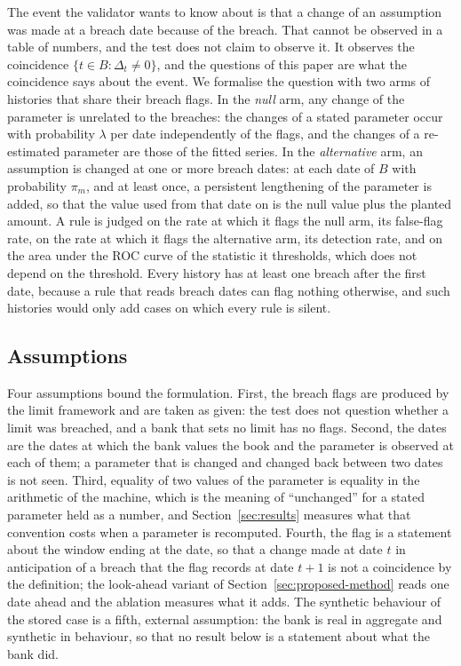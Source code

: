 The event the validator wants to know about is that a change of an assumption was made at a breach date because of the breach. That cannot be observed in a table of numbers, and the test does not claim to observe it. It observes the coincidence $\{t\in B:\Delta_t\ne 0\}$, and the questions of this paper are what the coincidence says about the event. We formalise the question with two arms of histories that share their breach flags. In the \emph{null} arm, any change of the parameter is unrelated to the breaches: the changes of a stated parameter occur with probability $\lambda$ per date independently of the flags, and the changes of a re-estimated parameter are those of the fitted series. In the \emph{alternative} arm, an assumption is changed at one or more breach dates: at each date of $B$ with probability $\pi_m$, and at least once, a persistent lengthening of the parameter is added, so that the value used from that date on is the null value plus the planted amount. A rule is judged on the rate at which it flags the null arm, its false-flag rate, on the rate at which it flags the alternative arm, its detection rate, and on the area under the ROC curve of the statistic it thresholds, which does not depend on the threshold. Every history has at least one breach after the first date, because a rule that reads breach dates can flag nothing otherwise, and such histories would only add cases on which every rule is silent.

\subsection{Assumptions}
\label{sec:problem-assumptions}

Four assumptions bound the formulation. First, the breach flags are produced by the limit framework and are taken as given: the test does not question whether a limit was breached, and a bank that sets no limit has no flags. Second, the dates are the dates at which the bank values the book and the parameter is observed at each of them; a parameter that is changed and changed back between two dates is not seen. Third, equality of two values of the parameter is equality in the arithmetic of the machine, which is the meaning of ``unchanged'' for a stated parameter held as a number, and Section~\ref{sec:results} measures what that convention costs when a parameter is recomputed. Fourth, the flag is a statement about the window ending at the date, so that a change made at date $t$ in anticipation of a breach that the flag records at date $t+1$ is not a coincidence by the definition; the look-ahead variant of Section~\ref{sec:proposed-method} reads one date ahead and the ablation measures what it adds. The synthetic behaviour of the stored case is a fifth, external assumption: the bank is real in aggregate and synthetic in behaviour, so that no result below is a statement about what the bank did.
